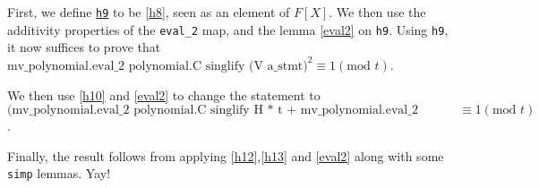 \documentclass{article}
\theoremstyle{definition}
\theoremstyle{remark}
\begin{document}
First, we define \href{https://github.com/BoltonBailey/formal-snarks-project/blob/7fd9cd122f5887f88f6a706b4f2a68a7153c7381/src/snarks/babysnark/knowledge_soundness.lean#L426}{\texttt{h9}} 
to be \ref{h8}, seen as an element of $F[X]$. We then use the additivity properties of the \texttt{eval\_2} map, and the lemma \ref{eval2} on \texttt{h9}. Using \texttt{h9}, it now suffices 
to prove that \newline $\text{mv\_polynomial.eval\_2 polynomial.C singlify (V a\_stmt)} ^ 2 \equiv 1 (\text{mod }t)$.

We then use \ref{h10} and \ref{eval2} to change the statement to \newline $\text{(mv\_polynomial.eval\_2 polynomial.C singlify H * t +
mv\_polynomial.eval\_2 polynomial.C singlify (mv\_polynomial.C 1))} \equiv 1 (\text{mod }t)$.

Finally, the result follows from applying \ref{h12},\ref{h13} and \ref{eval2} along with some \texttt{simp} lemmas. Yay!



\end{document}
